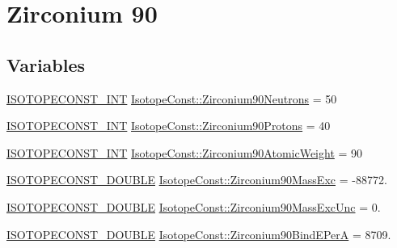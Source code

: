 \hypertarget{group___isotope_const-_zirconium-_zr90}{}\section{Zirconium 90}
\label{group___isotope_const-_zirconium-_zr90}
\subsection*{Variables}
\begin{DoxyCompactItemize}
\item 
\mbox{\hyperlink{group___isotope_const-_macros_ga5f18360b3e99483a35c32d789e62621c}{I\+S\+O\+T\+O\+P\+E\+C\+O\+N\+S\+T\+\_\+\+I\+NT}} \mbox{\hyperlink{group___isotope_const-_zirconium-_zr90_ga5bdf60babddbbad275d8894ef6e98b9b}{Isotope\+Const\+::\+Zirconium90\+Neutrons}} = 50
\item 
\mbox{\hyperlink{group___isotope_const-_macros_ga5f18360b3e99483a35c32d789e62621c}{I\+S\+O\+T\+O\+P\+E\+C\+O\+N\+S\+T\+\_\+\+I\+NT}} \mbox{\hyperlink{group___isotope_const-_zirconium-_zr90_ga277918ed93796181c6dfb042545a3b05}{Isotope\+Const\+::\+Zirconium90\+Protons}} = 40
\item 
\mbox{\hyperlink{group___isotope_const-_macros_ga5f18360b3e99483a35c32d789e62621c}{I\+S\+O\+T\+O\+P\+E\+C\+O\+N\+S\+T\+\_\+\+I\+NT}} \mbox{\hyperlink{group___isotope_const-_zirconium-_zr90_ga437ac7f091424c694d20becf5ed8f339}{Isotope\+Const\+::\+Zirconium90\+Atomic\+Weight}} = 90
\item 
\mbox{\hyperlink{group___isotope_const-_macros_ga8f45a7272ce02c0b4c65c44636ed719a}{I\+S\+O\+T\+O\+P\+E\+C\+O\+N\+S\+T\+\_\+\+D\+O\+U\+B\+LE}} \mbox{\hyperlink{group___isotope_const-_zirconium-_zr90_ga14fd593c1bba644e1fb81f5d85374199}{Isotope\+Const\+::\+Zirconium90\+Mass\+Exc}} = -\/88772.
\item 
\mbox{\hyperlink{group___isotope_const-_macros_ga8f45a7272ce02c0b4c65c44636ed719a}{I\+S\+O\+T\+O\+P\+E\+C\+O\+N\+S\+T\+\_\+\+D\+O\+U\+B\+LE}} \mbox{\hyperlink{group___isotope_const-_zirconium-_zr90_gae3cbe034551b8d8e2193c200f24399cf}{Isotope\+Const\+::\+Zirconium90\+Mass\+Exc\+Unc}} = 0.
\item 
\mbox{\hyperlink{group___isotope_const-_macros_ga8f45a7272ce02c0b4c65c44636ed719a}{I\+S\+O\+T\+O\+P\+E\+C\+O\+N\+S\+T\+\_\+\+D\+O\+U\+B\+LE}} \mbox{\hyperlink{group___isotope_const-_zirconium-_zr90_gaa903045489cd921b1485cc81eb5e314e}{Isotope\+Const\+::\+Zirconium90\+Bind\+E\+PerA}} = 8709.
\item 

\end{DoxyCompactItemize}
